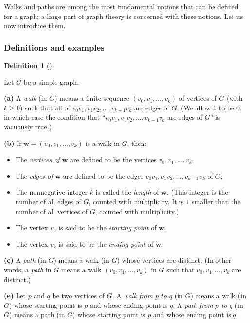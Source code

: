 \documentclass[numbers=enddot,12pt,final,onecolumn,notitlepage]{scrartcl}%
\theoremstyle{definition}
\newtheorem{defi}[theo]{Definition}
\newenvironment{definition}[1][]
{\begin{defi}[#1]\begin{leftbar}}
{\end{leftbar}\end{defi}}
\newcommand{\tup}[1]{\left( #1 \right)}
\begin{document}
Walks and paths are among the most fundamental notions that can be
defined for a graph; a large part of graph theory is concerned with
these notions. Let us now introduce them.

\subsubsection{Definitions and examples}

\begin{definition} \label{def.intro.walks}
Let $G$ be a simple graph.

\textbf{(a)} A \textit{walk} (in $G$) means a finite sequence
$\tup{v_0, v_1, \ldots, v_k}$ of vertices of $G$ (with $k \geq 0$)
such that all of
$v_0 v_1, v_1 v_2, \ldots, v_{k-1} v_k$ are edges of $G$. (We allow
$k$ to be $0$, in which case the condition that
``$v_0 v_1, v_1 v_2, \ldots, v_{k-1} v_k$ are edges of $G$'' is
vacuously true.)

\textbf{(b)} If $\mathbf{w} = \tup{v_0, v_1, \ldots, v_k}$ is a walk
in $G$, then:

\begin{itemize}
\item The \textit{vertices of $\mathbf{w}$} are defined to be
the vertices $v_0, v_1, \ldots, v_k$.
\item The
\textit{edges of $\mathbf{w}$} are defined to be the edges
$v_0 v_1, v_1 v_2, \ldots, v_{k-1} v_k$ of $G$;
\item The nonnegative integer $k$ is called the
\textit{length} of $\mathbf{w}$. (This integer is the number of all
edges of $G$, counted with multiplicity. It is $1$ smaller than the
number of all vertices of $G$, counted with multiplicity.)
\item The vertex $v_0$ is said to be the \textit{starting point} of
$\mathbf{w}$.
\item The vertex $v_k$ is said to be the \textit{ending point} of
$\mathbf{w}$.
\end{itemize}

\textbf{(c)} A \textit{path} (in $G$) means a walk (in $G$) whose
vertices are distinct. (In other words, a \textit{path} in $G$ means
a walk $\tup{v_0, v_1, \ldots, v_k}$ in $G$ such that
$v_0, v_1, \ldots, v_k$ are distinct.)

\textbf{(e)} Let $p$ and $q$ be two vertices of $G$. A
\textit{walk from $p$ to $q$} (in $G$) means a walk (in $G$) whose
starting point is $p$ and whose ending point is $q$. A
\textit{path from $p$ to $q$} (in $G$) means a path (in $G$) whose
starting point is $p$ and whose ending point is $q$.
\end{definition}
\end{document}
